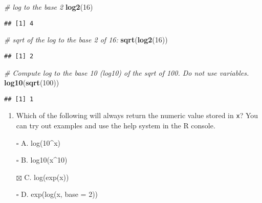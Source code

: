 \documentclass[
]{article}
\newenvironment{Shaded}{\begin{snugshade}}{\end{snugshade}}
\newcommand{\CommentTok}[1]{\textcolor[rgb]{0.56,0.35,0.01}{\textit{#1}}}
\newcommand{\DecValTok}[1]{\textcolor[rgb]{0.00,0.00,0.81}{#1}}
\newcommand{\KeywordTok}[1]{\textcolor[rgb]{0.13,0.29,0.53}{\textbf{#1}}}
\newcommand{\NormalTok}[1]{#1}
\providecommand{\tightlist}{%
  \setlength{\itemsep}{0pt}\setlength{\parskip}{0pt}}
\begin{document}
\begin{Shaded}
\begin{Highlighting}[]
\CommentTok{# log to the base 2 }
\KeywordTok{log2}\NormalTok{(}\DecValTok{16}\NormalTok{)}
\end{Highlighting}
\end{Shaded}

\begin{verbatim}
## [1] 4
\end{verbatim}

\begin{Shaded}
\begin{Highlighting}[]
\CommentTok{# sqrt of the log to the base 2 of 16:}
\KeywordTok{sqrt}\NormalTok{(}\KeywordTok{log2}\NormalTok{(}\DecValTok{16}\NormalTok{))}
\end{Highlighting}
\end{Shaded}

\begin{verbatim}
## [1] 2
\end{verbatim}

\begin{Shaded}
\begin{Highlighting}[]
\CommentTok{# Compute log to the base 10 (log10) of the sqrt of 100. Do not use variables.}
\KeywordTok{log10}\NormalTok{(}\KeywordTok{sqrt}\NormalTok{(}\DecValTok{100}\NormalTok{))}
\end{Highlighting}
\end{Shaded}

\begin{verbatim}
## [1] 1
\end{verbatim}

\begin{enumerate}
\def\labelenumi{\arabic{enumi}.}
\setcounter{enumi}{4}
\tightlist
\item
  Which of the following will always return the numeric value stored in
  \texttt{x}? You can try out examples and use the help system in the R
  console.
\end{enumerate}

\begin{itemize}
\tightlist
\item[$\square$]
  A. log(10\^{}x)
\item[$\square$]
  B. log10(x\^{}10)
\item[$\boxtimes$]
  C. log(exp(x))
\item[$\square$]
  D. exp(log(x, base = 2))
\end{itemize}
\end{document}
